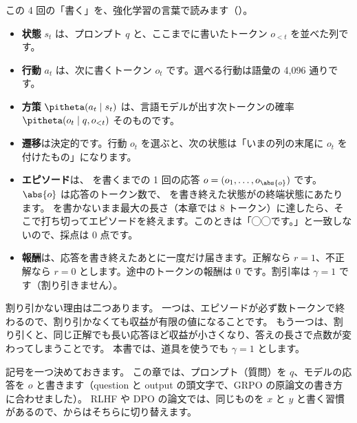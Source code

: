 この 4 回の「書く」を、強化学習の言葉で読みます（）。
\begin{itemize}
\item \textbf{状態} $s_t$ は、プロンプト $q$ と、ここまでに書いたトークン $o_{<t}$ を並べた列です。
\item \textbf{行動} $a_t$ は、次に書くトークン $o_t$ です。選べる行動は語彙の 4,096 通りです。
\item \textbf{方策} $\pitheta(a_t\mid s_t)$ は、言語モデルが出す次トークンの確率 $\pitheta(o_t\mid q,o_{<t})$ そのものです。
\item \textbf{遷移}は決定的です。行動 $o_t$ を選ぶと、次の状態は「いまの列の末尾に $o_t$ を付けたもの」になります。
\item \textbf{エピソード}は、 を書くまでの 1 回の応答 $o=(o_1,\dots,o_{\abs{o}})$ です。$\abs{o}$ は応答のトークン数で、 を書き終えた状態がの終端状態にあたります。
 を書かないまま最大の長さ（本章では 8 トークン）に達したら、そこで打ち切ってエピソードを終えます。このときは「◯◯です。」と一致しないので、採点は 0 点です。
\item \textbf{報酬}は、応答を書き終えたあとに一度だけ届きます。正解なら $r=1$、不正解なら $r=0$ とします。途中のトークンの報酬は 0 です。割引率は $\gamma=1$ です（割り引きません）。
\end{itemize}
割り引かない理由は二つあります。
一つは、エピソードが必ず数トークンで終わるので、割り引かなくても収益が有限の値になることです。
もう一つは、割り引くと、同じ正解でも長い応答ほど収益が小さくなり、答えの長さで点数が変わってしまうことです。
本書では、道具を使うでも $\gamma=1$ とします。

記号を一つ決めておきます。
この章では、プロンプト（質問）を $q$、モデルの応答を $o$ と書きます（question と output の頭文字で、GRPO の原論文\cite{shao2024deepseekmath}の書き方に合わせました）。
RLHF や DPO の論文では、同じものを $x$ と $y$ と書く習慣があるので、からはそちらに切り替えます。

